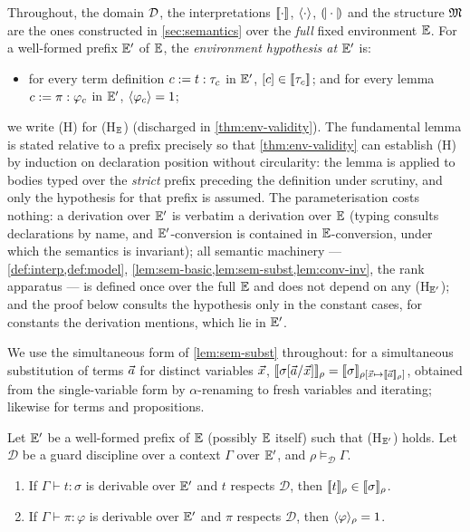 Throughout, the domain $\mathcal{D}$, the interpretations $[\![ \cdot ]\!]_{}$,
$\langle \cdot \rangle$, $(\!| \cdot |\!)$ and the structure $\mathfrak{M}$ are the ones
constructed in \cref{sec:semantics} over the \emph{full} fixed
environment $\mathbb{E}$.  For a well-formed prefix $\mathbb{E}'$ of $\mathbb{E}$, the
\emph{environment hypothesis at $\mathbb{E}'$} is:
\begin{itemize}[leftmargin=2em]
\item[(H$_{\Env'}$)] for every term definition $c \mathrel{:=} t : \tau_c$
  in $\mathbb{E}'$, $[c] \in [\![ \tau_c ]\!]_{}$; and for every lemma $c
  \mathrel{:=} \pi : \varphi_c$ in $\mathbb{E}'$, $\langle \varphi_c \rangle = 1$;
\end{itemize}
we write (H) for (H$_{\mathbb{E}}$) (discharged in \cref{thm:env-validity}).
The fundamental lemma is stated relative to a prefix precisely so that
\cref{thm:env-validity} can establish (H) by induction on declaration
position without circularity: the lemma is applied to bodies typed
over the \emph{strict} prefix preceding the definition under scrutiny,
and only the hypothesis for that prefix is assumed.  The
parameterisation costs nothing: a derivation over $\mathbb{E}'$ is verbatim
a derivation over $\mathbb{E}$ (typing consults declarations by name, and
$\mathbb{E}'$-conversion is contained in $\mathbb{E}$-conversion, under which the
semantics is invariant); all semantic machinery ---
\cref{def:interp,def:model},
\cref{lem:sem-basic,lem:sem-subst,lem:conv-inv}, the rank apparatus
--- is defined once over the full $\mathbb{E}$ and does not depend on any
(H$_{\Env'}$); and the proof below consults the hypothesis only in the
constant cases, for constants the derivation mentions, which lie in
$\mathbb{E}'$.

We use the simultaneous form of \cref{lem:sem-subst} throughout: for a
simultaneous substitution of terms $\vec{a}$ for distinct variables
$\vec{x}$, $[\![ \sigma[\vec{a}/\vec{x}] ]\!]_{\rho} =
[\![ \sigma ]\!]_{\rho[\vec{x} \mapsto [\![ \vec{a} ]\!]_\rho]}$, obtained from
the single-variable form by $\alpha$-renaming to fresh variables and
iterating; likewise for terms and propositions.

\begin{lemma}
\label{lem:fundamental}
Let $\mathbb{E}'$ be a well-formed prefix of $\mathbb{E}$ (possibly $\mathbb{E}$ itself)
such that (H$_{\Env'}$) holds.  Let $\mathcal{D}$ be a guard
discipline over a context $\Gamma$ over $\mathbb{E}'$, and $\rho
\vDash_{\mathcal{D}} \Gamma$.
\begin{enumerate}[leftmargin=2em]
\item If $\Gamma \vdash t : \sigma$ is derivable over $\mathbb{E}'$ and $t$
  respects $\mathcal{D}$, then $[\![ t ]\!]_\rho \in [\![ \sigma ]\!]_{\rho}$.
\item If $\Gamma \vdash \pi : \varphi$ is derivable over $\mathbb{E}'$ and
  $\pi$ respects $\mathcal{D}$, then $\langle \varphi \rangle_{\rho} = 1$.
\end{enumerate}
\end{lemma}

